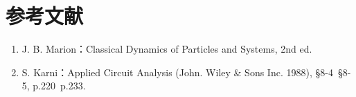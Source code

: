 \documentclass[UTF8]{article}
\begin{document}
\section{参考文献}
\begin{enumerate}
    \item J. B. Marion：Classical Dynamics of Particles and Systems, 2nd ed.
    \item S. Karni：Applied Circuit Analysis (John. Wiley \& Sons Inc. 1988), §8-4~§8-5, p.220~p.233.
\end{enumerate}

	
\end{document}
